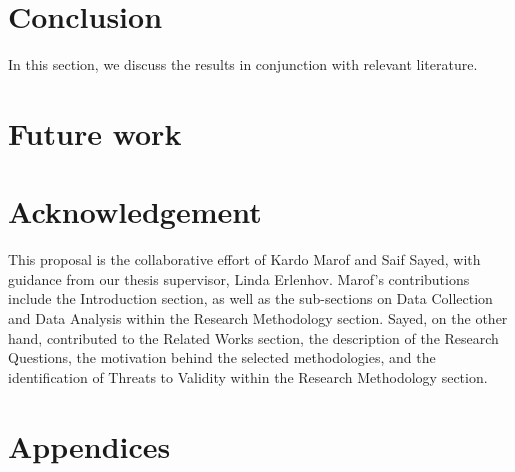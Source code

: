 \documentclass[conference]{IEEEtran}
\begin{document}
\section{Conclusion}
	
In this section, we discuss the results in conjunction with relevant literature.

\section{Future work}

\section{Acknowledgement}

         This proposal is the collaborative effort of Kardo Marof and Saif Sayed, with guidance from our thesis supervisor, Linda Erlenhov. Marof's contributions include the Introduction section, as well as the sub-sections on Data Collection and Data Analysis within the Research Methodology section. Sayed, on the other hand, contributed to the Related Works section, the description of the Research Questions, the motivation behind the selected methodologies, and the identification of Threats to Validity within the Research Methodology section.


\section{Appendices}
\end{document}
